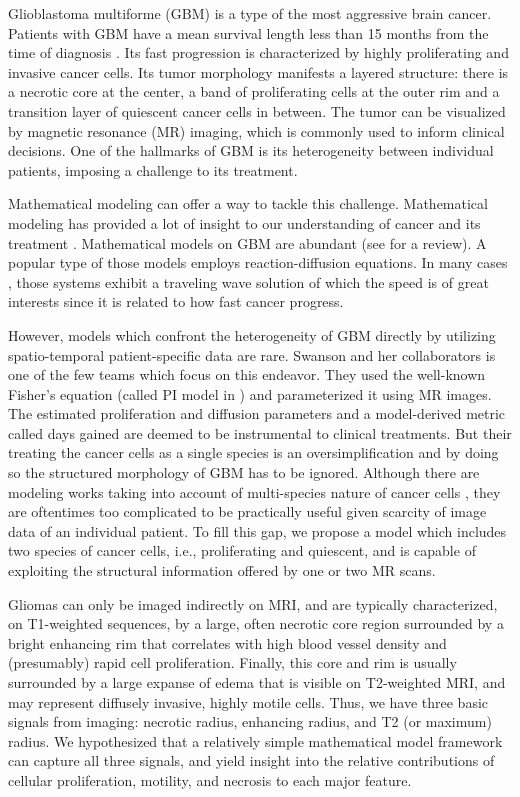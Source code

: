 \documentclass{aims}
\numberwithin{equation}{section}
\begin{document}
Glioblastoma multiforme (GBM) is a type of the most aggressive brain
cancer. Patients with GBM have a mean survival length less than 15
months from the time of diagnosis \cite{Norden2006}. Its fast progression
is characterized by highly proliferating and invasive cancer cells.
Its tumor morphology manifests a layered structure: there is a necrotic
core at the center, a band of proliferating cells at the outer rim
and a transition layer of quiescent cancer cells in between. The tumor
can be visualized by magnetic resonance (MR) imaging, which is commonly
used to inform clinical decisions. One of the hallmarks of GBM is
its heterogeneity between individual patients, imposing a challenge
to its treatment. 

Mathematical modeling can offer a way to tackle this challenge. Mathematical
modeling has provided a lot of insight to our understanding of cancer
and its treatment \cite{Kuang}. Mathematical models on GBM are abundant
(see \cite{GBMreview} for a review). A popular type of those models
employs reaction-diffusion equations. In many cases \cite{Harley2014,Gerlee2016,Stepien2018},
those systems exhibit a traveling wave solution of which the speed
is of great interests since it is related to how fast cancer progress. 

However, models which confront the heterogeneity of GBM directly by
utilizing spatio-temporal patient-specific data are rare. Swanson
and her collaborators \cite{Swanson2008,Neal2013,Jackson2015a} is
one of the few teams which focus on this endeavor. They used the well-known
Fisher's equation \cite{FISHER1937} (called PI model in \cite{Jackson2015a})
and parameterized it using MR images. The estimated proliferation
and diffusion parameters and a model-derived metric called days gained
are deemed to be instrumental to clinical treatments. But their treating
the cancer cells as a single species is an oversimplification and
by doing so the structured morphology of GBM has to be ignored. Although
there are modeling works taking into account of multi-species nature
of cancer cells \cite{Eikenberry2009,Swanson2011}, they are oftentimes
too complicated to be practically useful given scarcity of image data
of an individual patient. To fill this gap, we propose a model which
includes two species of cancer cells, i.e., proliferating and quiescent,
and is capable of exploiting the structural information offered by
one or two MR scans. 

Gliomas can only be imaged indirectly on MRI, and are typically characterized,
on T1-weighted sequences, by a large, often necrotic core region surrounded
by a bright enhancing rim that correlates with high blood vessel density
and (presumably) rapid cell proliferation. Finally, this core and
rim is usually surrounded by a large expanse of edema that is visible
on T2-weighted MRI, and may represent diffusely invasive, highly motile
cells. Thus, we have three basic signals from imaging: necrotic radius,
enhancing radius, and T2 (or maximum) radius. We hypothesized that
a relatively simple mathematical model framework can capture all three
signals, and yield insight into the relative contributions of cellular
proliferation, motility, and necrosis to each major feature.
\end{document}
